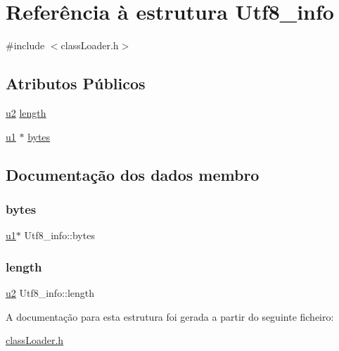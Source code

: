 \hypertarget{struct_utf8__info}{}\section{Referência à estrutura Utf8\+\_\+info}
\label{struct_utf8__info}


{\ttfamily \#include $<$class\+Loader.\+h$>$}

\subsection*{Atributos Públicos}
\begin{DoxyCompactItemize}
\item 
\hyperlink{util_8h_a55ef8d87fd202b8417704c089899c5b9}{u2} \hyperlink{struct_utf8__info_a98385cea95d17923174cdef1eafcc53c}{length}
\item 
\hyperlink{util_8h_a64f8055b64cf2a4c299c841130c5c938}{u1} $\ast$ \hyperlink{struct_utf8__info_a64f0134317a0c300908f866ef36d5b24}{bytes}
\end{DoxyCompactItemize}


\subsection{Documentação dos dados membro}
\mbox{\label{struct_utf8__info_a64f0134317a0c300908f866ef36d5b24}} 
\subsubsection{\texorpdfstring{bytes}{bytes}}
{\footnotesize\ttfamily \hyperlink{util_8h_a64f8055b64cf2a4c299c841130c5c938}{u1}$\ast$ Utf8\+\_\+info\+::bytes}

\mbox{\label{struct_utf8__info_a98385cea95d17923174cdef1eafcc53c}} 
\subsubsection{\texorpdfstring{length}{length}}
{\footnotesize\ttfamily \hyperlink{util_8h_a55ef8d87fd202b8417704c089899c5b9}{u2} Utf8\+\_\+info\+::length}



A documentação para esta estrutura foi gerada a partir do seguinte ficheiro\+:\begin{DoxyCompactItemize}
\item 
\hyperlink{class_loader_8h}{class\+Loader.\+h}\end{DoxyCompactItemize}
